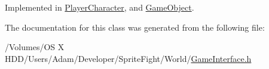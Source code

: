 Implemented in \hyperlink{class_player_character_a2ac275d3de97c5ecc260e93e0585168a}{Player\-Character}, and \hyperlink{class_game_object_adad7d284b670db722a2fda8e6a7997e3}{Game\-Object}.



The documentation for this class was generated from the following file\-:\begin{DoxyCompactItemize}
\item 
/\-Volumes/\-O\-S X H\-D\-D/\-Users/\-Adam/\-Developer/\-Sprite\-Fight/\-World/\hyperlink{_game_interface_8h}{Game\-Interface.\-h}\end{DoxyCompactItemize}
